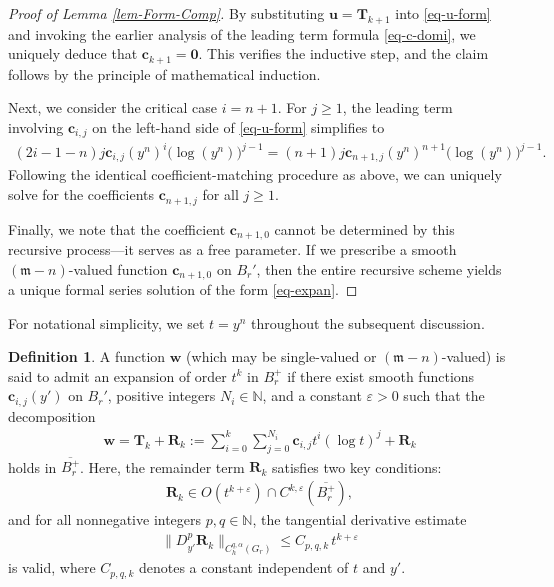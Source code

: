 \documentclass[11pt,reqno]{amsart}
\newcommand{\fm}{\mathfrak{m}}
\renewcommand{\epsilon}{\varepsilon}
\renewcommand{\leq}{\leqslant}
\renewcommand{\geq}{\geqslant}
\theoremstyle{definition}
\newtheorem{definition}[theorem]{Definition}
\numberwithin{equation}{section}
\begin{document}
\begin{proof}[Proof of Lemma \ref{lem-Form-Comp}]
By substituting $\mathbf{u}=\mathbf{T}_{k+1}$ into \eqref{eq-u-form} and invoking the earlier analysis of the leading term formula \eqref{eq-c-domi}, we uniquely deduce that $\mathbf{c}_{k+1}=\mathbf{0}$. This verifies the inductive step, and the claim follows by the principle of mathematical induction.

Next, we consider the critical case $i = n+1$. For $j\geq 1$, the leading term involving $\mathbf{c}_{i,j}$ on the left-hand side of \eqref{eq-u-form} simplifies to
\begin{align}
    (2i-1-n)j\mathbf{c}_{i,j}(y^n)^i\bigl(\log (y^n)\bigr)^{j-1} = (n+1)j\mathbf{c}_{n+1,j} (y^n)^{n+1}\bigl(\log (y^n)\bigr)^{j-1}.
\end{align}
Following the identical coefficient-matching procedure as above, we can uniquely solve for the coefficients $\mathbf{c}_{n+1,j}$ for all $j\geq 1$.

Finally, we note that the coefficient $\mathbf{c}_{n+1,0}$ cannot be determined by this recursive process—it serves as a free parameter. If we prescribe a smooth $(\fm-n)$-valued function $\mathbf{c}_{n+1,0}$ on $B_r'$, then the entire recursive scheme yields a unique formal series solution of the form \eqref{eq-expan}.
\end{proof}

For notational simplicity, we set $t = y^n$ throughout the subsequent discussion.

\begin{definition}\label{def-exp}
A function $\mathbf{w}$ (which may be single-valued or $(\fm-n)$-valued) is said to admit an expansion of order $t^k$ in $B^+_r$ if there exist smooth functions $\mathbf{c}_{i,j}(y')$ on $B_r'$, positive integers $N_i\in \mathbb{N}$, and a constant $\epsilon>0$ such that the decomposition
\begin{align}\label{eq-Taylor}
    \mathbf{w} = \mathbf{T}_k +\mathbf{R}_k := \sum_{i=0}^k \sum_{j=0}^{N_i} \mathbf{c}_{i,j} t^i (\log t)^j+\mathbf{R}_k
\end{align}
holds in $\overline{B^+_r}$. Here, the remainder term $\mathbf{R}_k$ satisfies two key conditions:
\begin{align}\label{eq-Rk-Cke}
 \mathbf{R}_k \in O(t^{k+\epsilon})\cap C^{k,\epsilon}(\overline{B^+_r}),
\end{align}
and for all nonnegative integers $p, q \in \mathbb{N}$, the tangential derivative estimate
\begin{align}\label{eq-Rk-Tan}
    \|D_{y'}^p \mathbf{R}_k \|_{C^{q,\alpha}_h(G_r)}\leq C_{p,q,k}\,t^{k+\epsilon}
\end{align}
is valid, where $C_{p,q,k}$ denotes a constant independent of $t$ and $y'$.
\end{definition}
\end{document}
